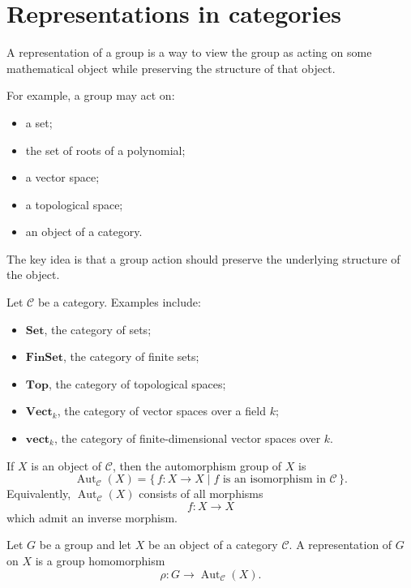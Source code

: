 \section{Representations in categories}

A representation of a group is a way to view the group as acting on some mathematical
object while preserving the structure of that object.

For example, a group may act on:

\begin{itemize}
    \item a set;
    \item the set of roots of a polynomial;
    \item a vector space;
    \item a topological space;
    \item an object of a category.
\end{itemize}

The key idea is that a group action should preserve the underlying structure of the object.


Let \(\mathcal{C}\) be a category. Examples include:

\begin{itemize}
    \item \(\mathbf{Set}\), the category of sets;
    \item \(\mathbf{FinSet}\), the category of finite sets;
    \item \(\mathbf{Top}\), the category of topological spaces;
    \item \(\mathbf{Vect}_k\), the category of vector spaces over a field \(k\);
    \item \(\mathbf{vect}_k\), the category of finite-dimensional vector spaces over \(k\).
\end{itemize}

If \(X\) is an object of \(\mathcal{C}\), then the automorphism group of \(X\) is
\[
    \operatorname{Aut}_{\mathcal{C}}(X)
    =
    \{\, f:X\to X \mid f \text{ is an isomorphism in } \mathcal{C}\,\}.
\]
Equivalently, \(\operatorname{Aut}_{\mathcal{C}}(X)\) consists of all morphisms
\[
    f:X\to X
\]
which admit an inverse morphism.

\begin{definition}
    Let \(G\) be a group and let \(X\) be an object of a category \(\mathcal{C}\).
    A representation of \(G\) on \(X\) is a group homomorphism
    \[
        \rho:G\longrightarrow \operatorname{Aut}_{\mathcal{C}}(X).
    \]
\end{definition}

